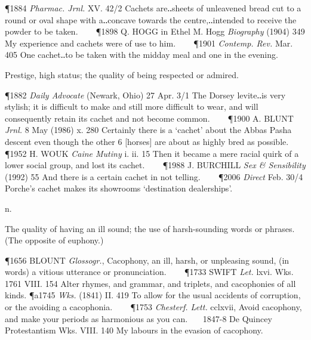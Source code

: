 \begin{description}[wide, labelwidth=!, labelindent=0pt]
\begin{myenumerate}
\P 1884 \textit{Pharmac.  Jrnl.} XV. 42/2 Cachets are‥sheets of unleavened bread cut to a round or oval shape with a‥concave towards the centre,‥intended to receive the powder to be taken.    
\P 1898 Q. HOGG  in Ethel M. Hogg \textit{Biography} (1904) 349 My experience and cachets were of use to him.    
\P 1901 \textit{Contemp.  Rev.} Mar. 405 One cachet‥to be taken with the midday meal and one in the evening.

 Prestige, high status; the quality of being respected or admired.

\P 1882 \textit{Daily  Advocate} (Newark, Ohio) 27 Apr. 3/1 The Dorsey levite‥is very stylish; it is difficult to make and still more difficult to wear, and will consequently retain its cachet and not become common.    
\P 1900 A. BLUNT  \textit{Jrnl.} 8 May (1986) x. 280 Certainly there is a ‘cachet’ about the Abbas Pasha descent even though the other 6 [horses] are about as highly bred as possible.    
\P 1952 H. WOUK  \textit{Caine Mutiny} i. ii. 15 Then it became a mere racial quirk of a lower social group, and lost its cachet.    
\P 1988 J. BURCHILL  \textit{Sex \& Sensibility} (1992) 55 And there is a certain cachet in not telling.    
\P 2006 \textit{Direct} Feb. 30/4 Porche's cachet makes its showrooms ‘destination dealerships’.
\end{myenumerate}


 n.

\noindent {}

\vspace{-0.3cm}

\begin{myenumerate}

 The quality of having an ill sound; the use of harsh-sounding words or phrases. (The opposite of euphony.)

\P 1656 BLOUNT  \textit{Glossogr.}, Cacophony, an ill, harsh, or unpleasing sound, (in words) a vitious utterance or pronunciation.    
\P 1733 SWIFT  \textit{Let.} lxvi. Wks. 1761 VIII. 154 Alter rhymes, and grammar, and triplets, and cacophonies of all kinds.
\P a1745 \textit{Wks.} (1841) II. 419 To allow for the usual accidents of corruption, or the avoiding a cacophonia.    
\P 1753 \textit{Chesterf.  Lett.} cclxvii, Avoid cacophony, and make your periods as harmonious as you can.    1847-8 De Quincey Protestantism Wks. VIII. 140 My labours in the evasion of cacophony.


\end{myenumerate}
\end{description}
